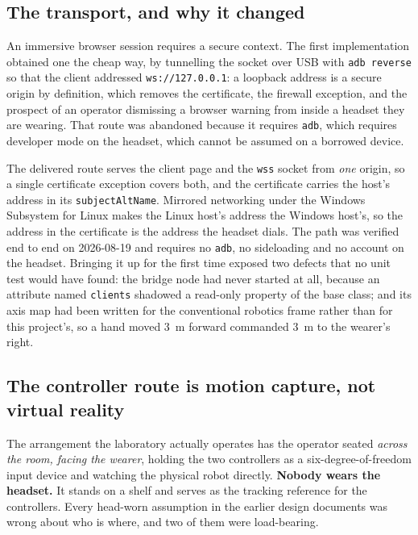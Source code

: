 \subsection{The transport, and why it changed}
\label{sec:vr-transport}

An immersive browser session requires a secure context. The first
implementation obtained one the cheap way, by tunnelling the socket over USB
with \texttt{adb reverse} so that the client addressed
\texttt{ws://127.0.0.1}: a loopback address is a secure origin by definition,
which removes the certificate, the firewall exception, and the prospect of an
operator dismissing a browser warning from inside a headset they are wearing.
That route was abandoned because it requires \texttt{adb}, which requires
developer mode on the headset, which cannot be assumed on a borrowed device.

The delivered route serves the client page and the \texttt{wss} socket from
\emph{one} origin, so a single certificate exception covers both, and the
certificate carries the host's address in its \texttt{subjectAltName}.
Mirrored networking under the Windows Subsystem for Linux makes the Linux
host's address the Windows host's, so the address in the certificate is the
address the headset dials. The path was verified end to end on
2026-08-19 and requires no \texttt{adb}, no sideloading and no account on the
headset. Bringing it up for the first time exposed two defects that no unit
test would have found: the bridge node had never started at all, because an
attribute named \texttt{clients} shadowed a read-only property of the base
class; and its axis map had been written for the conventional robotics frame
rather than for this project's, so a hand moved \SI{3}{\metre} forward
commanded \SI{3}{\metre} to the wearer's right.

\subsection{The controller route is motion capture, not virtual reality}
\label{sec:desk}

The arrangement the laboratory actually operates has the operator seated
\emph{across the room, facing the wearer}, holding the two controllers as a
six-degree-of-freedom input device and watching the physical robot directly.
\textbf{Nobody wears the headset.} It stands on a shelf and serves as the
tracking reference for the controllers. Every head-worn assumption in the
earlier design documents was wrong about who is where, and two of them were
load-bearing.

